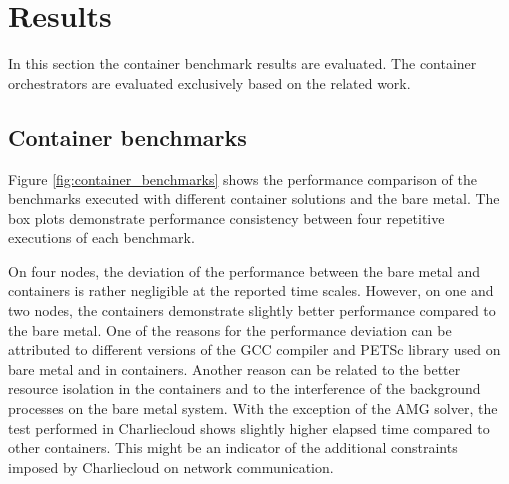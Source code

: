 \documentclass[12pt]{article}
\begin{document}
\section{Results}
In this section the container benchmark results are evaluated. The container orchestrators are evaluated exclusively based on the related work.

\subsection{Container benchmarks}
Figure \ref{fig:container_benchmarks} shows the performance comparison of the benchmarks executed with different container solutions and the bare metal. The box plots demonstrate performance consistency between four repetitive executions of each benchmark.

On four nodes, the deviation of the performance between the bare metal and containers is rather negligible at the reported time scales. However, on one and two nodes, the containers demonstrate slightly better performance compared to the bare metal. One of the reasons for the performance deviation can be attributed to different versions of the GCC compiler and PETSc library used on bare metal and in containers. Another reason can be related to the better resource isolation in the containers and to the interference of the background processes on the bare metal system. With the exception of the AMG solver, the test performed in Charliecloud shows slightly higher elapsed time compared to other containers. This might be an indicator of the additional constraints imposed by Charliecloud on network communication.
\end{document}
